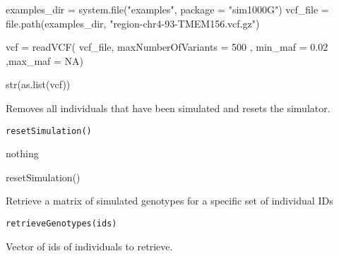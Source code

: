 \documentclass[letterpaper]{book}
\begin{document}
%
\begin{Examples}
\begin{ExampleCode}

examples_dir = system.file("examples", package = "sim1000G")
vcf_file = file.path(examples_dir,
  "region-chr4-93-TMEM156.vcf.gz")

vcf = readVCF( vcf_file, maxNumberOfVariants = 500 ,
               min_maf = 0.02 ,max_maf = NA)

str(as.list(vcf))
\end{ExampleCode}
\end{Examples}
%
\begin{Description}\relax
Removes all individuals that have been simulated and resets the simulator.
\end{Description}
%
\begin{Usage}
\begin{verbatim}
resetSimulation()
\end{verbatim}
\end{Usage}
%
\begin{Value}
nothing
\end{Value}
%
\begin{Examples}
\begin{ExampleCode}

resetSimulation()

\end{ExampleCode}
\end{Examples}
%
\begin{Description}\relax
Retrieve a matrix of simulated genotypes for a specific set of individual IDs
\end{Description}
%
\begin{Usage}
\begin{verbatim}
retrieveGenotypes(ids)
\end{verbatim}
\end{Usage}
%
\begin{Arguments}
\begin{ldescription}
\item[\code{ids}] Vector of ids of individuals to retrieve.
\end{ldescription}
\end{Arguments}
%
\end{document}
